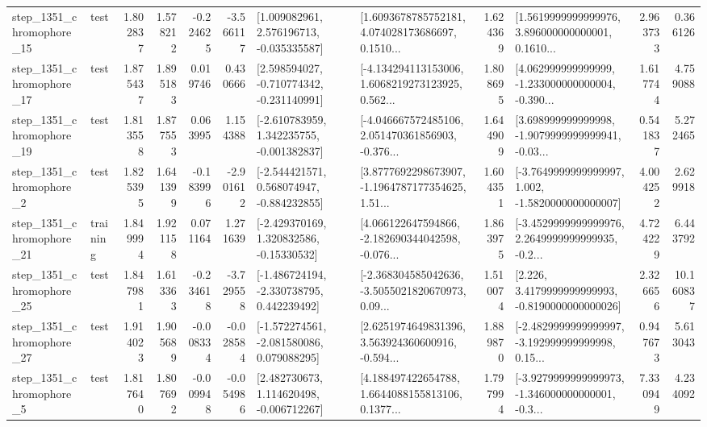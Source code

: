 \begin{tabular}{llrrrrllrlrr}
 step\_1351\_chromophore\_15 &      test &      1.802837 &    1.578212 &     -0.224625 & -3.566117 &    [1.009082961, 2.576196713, -0.035335587] &  [1.6093678785752181, 4.074028173686697, 0.1510... &       1.624369 &  [1.5619999999999976, 3.896000000000001, 0.1610... &            2.963733 &          0.366126 \\
 step\_1351\_chromophore\_17 &      test &      1.875437 &    1.895183 &      0.019746 &  0.430666 &   [2.598594027, -0.710774342, -0.231140991] &  [-4.134294113153006, 1.6068219273123925, 0.562... &       1.808695 &  [4.062999999999999, -1.233000000000004, -0.390... &            1.617744 &          4.759088 \\
 step\_1351\_chromophore\_19 &      test &      1.813558 &    1.877553 &      0.063995 &  1.154388 &   [-2.610783959, 1.342235755, -0.001382837] &  [-4.046667572485106, 2.051470361856903, -0.376... &       1.644909 &  [3.698999999999998, -1.9079999999999941, -0.03... &            0.541837 &          5.272465 \\
  step\_1351\_chromophore\_2 &      test &      1.825395 &    1.641399 &     -0.183996 & -2.901612 &   [-2.544421571, 0.568074947, -0.884232855] &  [3.8777692298673907, -1.1964787177354625, 1.51... &       1.604351 &  [-3.7649999999999997, 1.002, -1.5820000000000007] &            4.004252 &          2.629918 \\
 step\_1351\_chromophore\_21 &  training &      1.849994 &    1.921158 &      0.071164 &  1.271639 &    [-2.429370169, 1.320832586, -0.15330532] &  [4.066122647594866, -2.182690344042598, -0.076... &       1.863975 &  [-3.4529999999999976, 2.2649999999999935, -0.2... &            4.724229 &          6.443792 \\
 step\_1351\_chromophore\_25 &      test &      1.847981 &    1.613363 &     -0.234618 & -3.729558 &   [-1.486724194, -2.330738795, 0.442239492] &  [-2.368304585042636, -3.5055021820670973, 0.09... &       1.510074 &   [2.226, 3.4179999999999993, -0.8190000000000026] &            2.326656 &         10.160837 \\
 step\_1351\_chromophore\_27 &      test &      1.914023 &    1.905689 &     -0.008334 & -0.028584 &   [-1.572274561, -2.081580086, 0.079088295] &  [2.6251974649831396, 3.563924360600916, -0.594... &       1.889870 &  [-2.4829999999999997, -3.192999999999998, 0.15... &            0.947673 &          5.613043 \\
  step\_1351\_chromophore\_5 &      test &      1.817640 &    1.807692 &     -0.009948 & -0.054986 &    [2.482730673, 1.114620498, -0.006712267] &  [4.188497422654788, 1.6644088155813106, 0.1377... &       1.797994 &  [-3.9279999999999973, -1.346000000000001, -0.3... &            7.330949 &          4.234092 \\

\end{tabular}
